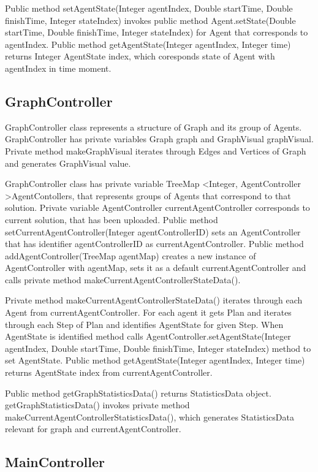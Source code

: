 \documentclass[thesis=B,english]{FITthesis}[2019/12/23]
\begin{document}
Public method setAgentState(Integer agentIndex, Double startTime, Double finishTime, Integer stateIndex) invokes public method Agent.setState(Double startTime, Double finishTime, Integer stateIndex) for Agent that corresponds to agentIndex. Public method getAgentState(Integer agentIndex, Integer time) returns Integer AgentState index, which coresponds state of Agent with agentIndex in time moment.

\subsection{GraphController}

GraphController class represents a structure of Graph and its group of Agents.
GraphController has private variables Graph graph and GraphVisual graphVisual. Private method makeGraphVisual iterates through Edges and Vertices of Graph and generates GraphVisual value.  

GraphController class has private variable TreeMap \textless Integer, AgentController \textgreater AgentContollers, that represents groups of Agents that correspond to that solution. Private variable AgentController currentAgentController corresponds to current solution, that has been uploaded. Public method setCurrentAgentController(Integer agentControllerID) sets an AgentController that has identifier agentControllerID as currentAgentController. Public method addAgentController(TreeMap agentMap) creates a new instance of AgentController with agentMap, sets it as a default currentAgentController and calls private method makeCurrentAgentControllerStateData().

Private method makeCurrentAgentControllerStateData() iterates through each Agent from currentAgentController. For each agent it gets Plan and iterates through each Step of Plan and identifies AgentState for given Step. When AgentState is identified method calls AgentController.setAgentState(Integer agentIndex, Double startTime, Double finishTime, Integer stateIndex) method to set AgentState. Public method getAgentState(Integer agentIndex, Integer time) returns AgentState index from currentAgentController. 

Public method getGraphStatisticsData()  returns StatisticsData object.   getGraphStatisticsData() invokes private method makeCurrentAgentControllerStatisticsData(), which generates StatisticsData relevant for graph and currentAgentController.

\subsection{MainController}
\end{document}

